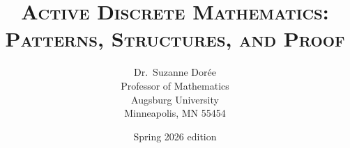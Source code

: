 \documentclass[11pt]{book}
\begin{document}
\begin{frontmatter}
    
\title{\textsc{Active Discrete Mathematics:\\ Patterns, Structures, and Proof}} 
\author{Dr.\ Suzanne Dor\'ee \\ Professor of Mathematics\\Augsburg University\\ Minneapolis, MN 55454}
\date{Spring 2026 edition}
\maketitle

\tableofcontents

% 

\end{frontmatter}

\mainmatter


% 









 
\end{document}
